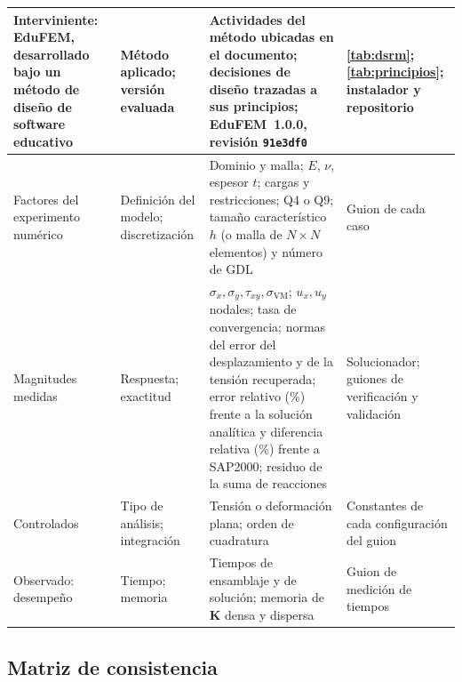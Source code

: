 {\begin{longtable}{@{}>{\raggedright\arraybackslash}p{2.9cm}>{\raggedright\arraybackslash}p{2.5cm}>{\raggedright\arraybackslash}p{5.5cm}>{\raggedright\arraybackslash}p{2.7cm}@{}}
Interviniente: EduFEM, desarrollado bajo un método de diseño de software educativo & Método aplicado; versión evaluada & Actividades del método ubicadas en el documento; decisiones de diseño trazadas a sus principios; EduFEM~1.0.0, revisión \texttt{91e3df0} & \autoref{tab:dsrm}; \autoref{tab:principios}; instalador y repositorio \\
\midrule
Factores del experimento numérico & Definición del modelo; discretización & Dominio y malla; $E$, $\nu$, espesor $t$; cargas y restricciones; Q4 o Q9; tamaño característico $h$ (o malla de $N\times N$ elementos) y número de GDL & Guion de cada caso \\
Magnitudes medidas & Respuesta; exactitud & $\sigma_x,\sigma_y,\tau_{xy},\sigma_{\mathrm{VM}}$; $u_x,u_y$ nodales; tasa de convergencia; normas del error del desplazamiento y de la tensión recuperada; error relativo (\%) frente a la solución analítica y diferencia relativa (\%) frente a SAP2000; residuo de la suma de reacciones & Solucionador; guiones de verificación y validación \\
Controlados & Tipo de análisis; integración & Tensión o deformación plana; orden de cuadratura & Constantes de cada configuración del guion \\
Observado: desempeño & Tiempo; memoria & Tiempos de ensamblaje y de solución; memoria de $\bm{K}$ densa y dispersa & Guion de medición de tiempos \\
\end{longtable}}

\subsection{Matriz de consistencia}
\label{sec:matriz-consistencia}

